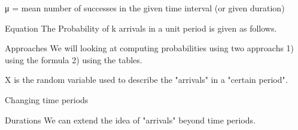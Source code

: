 μ = mean number of successes in the given time interval (or given duration)

Equation 
The Probability of k arrivals in a unit period is given as follows.


Approaches
We will looking at computing probabilities using two approachs
1) using the formula
2) using the tables.

X is the random variable used to describe the "arrivals" in a "certain period".


Changing time periods


Durations
We can extend the idea of "arrivals" beyond time periods.



